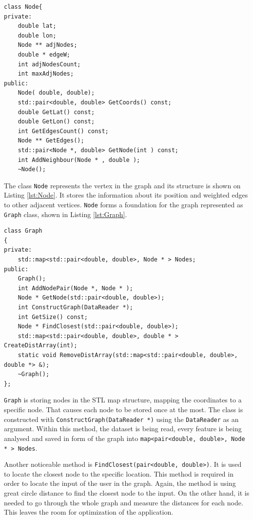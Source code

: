 \documentclass[thesis=M,english]{FITthesis}[2012/10/20]
\begin{document}
\begin{lstlisting}[frame=single, caption={\texttt{Node} class}, label={lst:Node}]
class Node{
private:
    double lat;
    double lon;
    Node ** adjNodes;
    double * edgeW;
    int adjNodesCount;
    int maxAdjNodes;
public:
    Node( double, double);
    std::pair<double, double> GetCoords() const;
    double GetLat() const;
    double GetLon() const;
    int GetEdgesCount() const;
    Node ** GetEdges();
    std::pair<Node *, double> GetNode(int ) const; 
	int AddNeighbour(Node * , double );
    ~Node();
\end{lstlisting}

The class \texttt{Node} represents the vertex in the graph and its structure is shown on Listing \ref{lst:Node}. It stores the information about its position and weighted edges to other adjacent vertices. \texttt{Node} forms a foundation for the graph represented as \texttt{Graph} class, shown in Listing \ref{lst:Graph}.

\begin{lstlisting}[frame=single, caption={\texttt{Graph} class}, label={lst:Graph}, breaklines=true]
class Graph
{
private:
    std::map<std::pair<double, double>, Node * > Nodes;
public:
    Graph();
    int AddNodePair(Node *, Node * );
    Node * GetNode(std::pair<double, double>);
    int ConstructGraph(DataReader *);
    int GetSize() const;
    Node * FindClosest(std::pair<double, double>);
    std::map<std::pair<double, double>, double * > CreateDistArray(int);
    static void RemoveDistArray(std::map<std::pair<double, double>, double *> &);
    ~Graph();
};
\end{lstlisting}

\texttt{Graph} is storing nodes in the STL map structure, mapping the coordinates to a specific node. That causes each node to be stored once at the most. The class is constructed with \texttt{ConstructGraph(DataReader *)} using the \texttt{DataReader} as an argument. Within this method, the dataset is being read, every feature is being analysed and saved in form of the graph into \texttt{map<pair<double, double>, Node * > Nodes}.

Another noticeable method is \texttt{FindClosest(pair<double, double>)}. It is used to locate the closest node to the specific location. This method is required in order to locate the input of the user in the graph. Again, the method is using great circle distance to find the closest node to the input. 
On the other hand, it is needed to go through the whole graph and measure the distances for each node. 
This leaves the room for optimization of the application.
\end{document}
